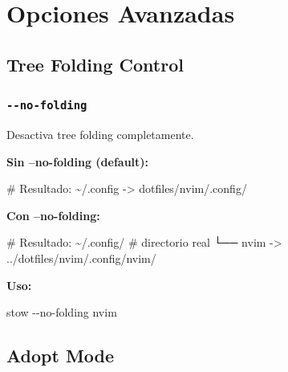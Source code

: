 \documentclass[
  doc,
  floatsintext,
  longtable,
  a4paper,
  nolmodern,
  notxfonts,
  notimes,
  12pt,
  colorlinks=true,linkcolor=blue,citecolor=blue,urlcolor=blue]{apa7}
\newenvironment{Shaded}{\begin{snugshade}}{\end{snugshade}}
\newcommand{\AttributeTok}[1]{\textcolor[rgb]{0.40,0.45,0.13}{#1}}
\newcommand{\CommentTok}[1]{\textcolor[rgb]{0.37,0.37,0.37}{#1}}
\newcommand{\ExtensionTok}[1]{\textcolor[rgb]{0.00,0.23,0.31}{#1}}
\newcommand{\NormalTok}[1]{\textcolor[rgb]{0.00,0.23,0.31}{#1}}
\newcommand{\OperatorTok}[1]{\textcolor[rgb]{0.37,0.37,0.37}{#1}}
\begin{document}
\section{Opciones Avanzadas}\label{opciones-avanzadas-1}

\subsection{Tree Folding Control}\label{tree-folding-control}

\subsubsection{\texorpdfstring{\texttt{-\/-no-folding}}{-\/-no-folding}}\label{no-folding}

Desactiva tree folding completamente.

\textbf{Sin --no-folding (default):}

\begin{Shaded}
\begin{Highlighting}[]
\CommentTok{\# Resultado:}
\ExtensionTok{\textasciitilde{}/.config} \AttributeTok{{-}}\OperatorTok{\textgreater{}}\NormalTok{ dotfiles/nvim/.config/}
\end{Highlighting}
\end{Shaded}

\textbf{Con --no-folding:}

\begin{Shaded}
\begin{Highlighting}[]
\CommentTok{\# Resultado:}
\ExtensionTok{\textasciitilde{}/.config/}              \CommentTok{\# directorio real}
  \ExtensionTok{└──}\NormalTok{ nvim }\AttributeTok{{-}}\OperatorTok{\textgreater{}}\NormalTok{ ../dotfiles/nvim/.config/nvim/}
\end{Highlighting}
\end{Shaded}

\textbf{Uso:}

\begin{Shaded}
\begin{Highlighting}[]
\ExtensionTok{stow} \AttributeTok{{-}{-}no{-}folding}\NormalTok{ nvim}
\end{Highlighting}
\end{Shaded}

\subsection{Adopt Mode}\label{adopt-mode}
\end{document}
